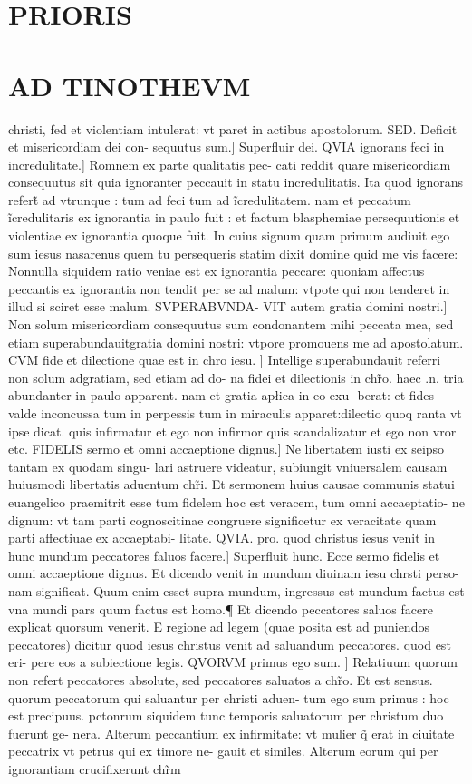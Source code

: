 \documentclass{article}
\begin{document}
\begin{pages}
\section*{PRIORIS }
\section*{AD TINOTHEVM }\pstart christi, fed et violentiam intulerat: vt paret in actibus apostolorum. SED. Deficit et misericordiam dei con- sequutus sum.] Superfluir dei. QVIA ignorans feci in incredulitate.] Romnem ex parte qualitatis pec- cati reddit quare misericordiam consequutus sit  quia ignoranter peccauit in statu incredulitatis. Ita quod ignorans refert̃ ad vtrunque  : tum ad feci tum ad ĩcredulitatem. nam et peccatum ĩcredulitaris ex ignorantia in paulo fuit : et factum blasphemiae  persequutionis et violentiae ex ignorantia quoque  fuit. In cuius signum quam primum audiuit ego sum iesus nasarenus quem tu persequeris  statim dixit domine quid me vis facere: Nonnulla siquidem ratio veniae est ex ignorantia peccare: quoniam affectus peccantis ex ignorantia  non tendit per se ad malum: vtpote qui non tenderet in illud si sciret esse malum. SVPERABVNDA- VIT autem gratia domini nostri.] Non solum misericordiam consequutus sum condonantem mihi peccata mea, sed etiam superabundauitgratia domini nostri: vtpore promouens me ad apostolatum. CVM fide et dilectione quae est in chro iesu. ] Intellige superabundauit  referri non solum adgratiam, sed etiam ad do- na fidei et dilectionis in chr̃o. haec .n. tria abundanter in paulo apparent. nam et gratia apłica in eo exu- berat: et fides valde inconcussa tum in perpessis tum in miraculis apparet:dilectio quoq ranta vt ipse dicat. quis infirmatur et ego non infirmor  quis scandalizatur et ego non vror etc.   \pend\pstart FIDELIS sermo et omni accaeptione dignus.] Ne libertatem iusti ex seipso tantam ex quodam singu- lari astruere videatur, subiungit vniuersalem causam huiusmodi libertatis  aduentum chr̃i. Et sermonem huius causae communis statui euangelico praemitrit esse tum fidelem  hoc est veracem, tum omni accaeptatio- ne dignum: vt tam parti cognoscitinae congruere significetur ex veracitate  quam parti affectiuae ex accaeptabi- litate. QVIA. pro. quod  christus iesus venit in hunc mundum peccatores faluos facere.] Superfluit hunc. Ecce sermo fidelis et omni accaeptione dignus. Et dicendo venit in mundum  diuinam iesu chrsti perso- nam significat. Quum enim esset supra mundum, ingressus est mundum  factus est vna mundi pars quum factus est homo.¶ Et dicendo peccatores saluos facere  explicat quorsum venerit. E regione ad legem (quae posita est ad puniendos peccatores) dicitur quod iesus christus venit ad saluandum peccatores. quod est eri- pere eos a subiectione legis. QVORVM primus ego sum. ] Relatiuum quorum  non refert peccatores absolute, sed peccatores saluatos a chr̃o. Et est sensus. quorum peccatorum qui saluantur per christi aduen- tum ego sum primus : hoc est precipuus. pctonrum siquidem tunc temporis saluatorum per christum  duo fuerunt ge- nera. Alterum peccantium ex infirmitate: vt mulier q̃ erat in ciuitate peccatrix  vt petrus qui ex timore ne- gauit et similes. Alterum eorum qui per ignorantiam crucifixerunt chr̃m  
\end{pages}
\end{document}
